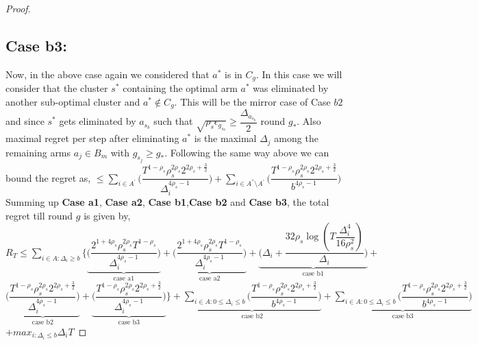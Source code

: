 \begin{proof}
\subsection{Case b3:}
Now, in the above case again we considered that $a^{*}$ is in $C_{g}$. In this case we will consider that the cluster $s^{*}$ containing the optimal arm $a^{*}$ was eliminated by another sub-optimal cluster and $a^{*}\notin C_{g}$. This will be the mirror case of Case $b2$ and since $s^{*}$ gets eliminated by $a_{s_{b}}$ such that $\sqrt{\rho_{s}\epsilon_{g_{s_{b}}}}\geq\dfrac{\Delta_{a_{s_{b}}}}{2}$ round $g_{*}$. Also maximal regret per step after eliminating $a^{*}$ is the maximal $\Delta_{j}$ among the remaining arms $a_{j}\in B_{m}$ with $g_{s_{j}}\geq g_{*}$. Following the same way above we can bound the regret as,
\newline
\hspace*{0em}$\leq\sum_{i\in A^{'}}\bigg(\dfrac{T^{1-\rho_{s}}\rho_{s}^{2\rho_{s}}2^{2\rho_{s}+\frac{3}{2}}}{\Delta_{i}^{4\rho_{s}-1}} \bigg)+\sum_{i\in A^{''}\setminus A^{'}}\bigg(\dfrac{T^{1-\rho_{s}}\rho_{s}^{2\rho_{s}}2^{2\rho_{s}+\frac{3}{2}}}{b^{4\rho_{s}-1}} \bigg)$
\newline
Summing up \textbf{Case a1}, \textbf{Case a2}, \textbf{Case b1},\textbf{Case b2} and \textbf{Case b3}, the total regret till round $g$ is given by,
\newline $R_{T}\leq \sum_{i\in A:\Delta_{i}\geq b}\bigg\lbrace\underbrace{\bigg(\dfrac{2^{1+4\rho_{s}}\rho_{s}^{2\rho_{s}}T^{1-\rho_{s}}}{\Delta_{i}^{4\rho_{s}-1}}\bigg)}_{\text{case a1}} + \underbrace{\bigg(\dfrac{2^{1+4\rho_{s}}\rho_{s}^{2\rho_{s}}T^{1-\rho_{s}}}{\Delta_{i}^{4\rho_{s}-1}}\bigg)}_{\text{case a2}} + \underbrace{\bigg(\Delta_{i}+\dfrac{32\rho_{s}\log{(T\dfrac{\Delta_{i}^{4}}{16\rho_{s}^{2}})}}{\Delta_{i}}\bigg)}_{\text{case b1}}  +$\newline$ \underbrace{\bigg(\dfrac{T^{1-\rho_{s}}\rho_{s}^{2\rho_{s}}2^{2\rho_{s}+\frac{3}{2}}}{\Delta_{i}^{4\rho_{s} -1}} \bigg)}_{\text{case b2}} + \underbrace{\bigg(\dfrac{T^{1-\rho_{s}}\rho_{s}^{2\rho_{s}}2^{2\rho_{s}+\frac{3}{2}}}{\Delta_{i}^{4\rho_{s} -1}} \bigg)}_{\text{case b3}}\bigg \rbrace+\underbrace{\sum_{i\in A:0\leq\Delta_{i}\leq b}\bigg(\dfrac{T^{1-\rho_{s}}\rho_{s}^{2\rho_{s}}2^{2\rho_{s}+\frac{3}{2}}}{b^{4\rho_{s} -1}} \bigg)}_{\text{case b2}}+ \underbrace{\sum_{i\in A:0\leq\Delta_{i}\leq b}\bigg(\dfrac{T^{1-\rho_{s}}\rho_{s}^{2\rho_{s}}2^{2\rho_{s}+\frac{3}{2}}}{b^{4\rho_{s} -1}} \bigg)}_{\text{case b3}}$\newline$ + max_{i:\Delta_{i}\leq b}\Delta_{i}T$

\end{proof}

